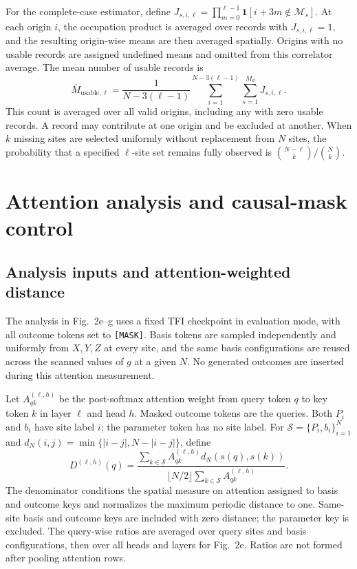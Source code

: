 \documentclass[11pt,a4paper]{article}
\newcommand{\TBD}[1]{\textcolor{red!70!black}{\textsf{[TBD: #1]}}}
\newcommand{\ind}{\mathbf{1}}
\newcommand{\sechead}[2]{\section{#2}}
\newcommand{\subhead}[1]{\subsection*{#1}}
\begin{document}
For the complete-case estimator, define
$J_{s,i,\ell}=\prod_{m=0}^{\ell-1}
\ind[i+3m\notin\mathcal{M}_s]$.
At each origin $i$, the occupation product is averaged over records
with $J_{s,i,\ell}=1$, and the resulting origin-wise means are then
averaged spatially. Origins with no usable records are assigned
undefined means and omitted from this correlator average. The mean
number of usable records is
\begin{equation}
\overline{M}_{\mathrm{usable},\ell}
=
\frac{1}{N-3(\ell-1)}
\sum_{i=1}^{N-3(\ell-1)}
\sum_{s=1}^{M_d}J_{s,i,\ell}.
\label{supp:eq:usable}
\end{equation}
This count is averaged over all valid origins, including any with
zero usable records. A record may contribute at one origin and be
excluded at another. When $k$ missing sites are selected uniformly
without replacement from $N$ sites, the probability that a specified
$\ell$-site set remains fully observed is
$\binom{N-\ell}{k}/\binom{N}{k}$.

\sechead{S5}{Attention analysis and causal-mask control}
\label{supp:attention}

\subhead{Analysis inputs and attention-weighted distance}
The analysis in Fig.~2e--g uses a fixed TFI checkpoint in evaluation mode,
with all outcome tokens set to \texttt{[MASK]}. Basis tokens are sampled
independently and uniformly from $X,Y,Z$ at every site, and the same
basis configurations are reused across the scanned values of $g$ at a
given $N$. No generated outcomes are inserted during this attention
measurement. 

Let $A^{(\ell,h)}_{qk}$ be the post-softmax attention weight from query
token $q$ to key token $k$ in layer $\ell$ and head $h$. Masked outcome
tokens are the queries. Both $P_i$ and $b_i$ have site label $i$;
the parameter token has no site label. For
$\mathcal{S}=\{P_i,b_i\}_{i=1}^{N}$ and
$d_N(i,j)=\min\{|i-j|,N-|i-j|\}$, define
\begin{equation}
D^{(\ell,h)}(q)=
\frac{\sum_{k\in\mathcal{S}}A^{(\ell,h)}_{qk}
d_N(s(q),s(k))}
{\lfloor N/2\rfloor\sum_{k\in\mathcal{S}}A^{(\ell,h)}_{qk}}.
\label{supp:eq:attention_distance}
\end{equation}
The denominator conditions the spatial measure on attention assigned to
basis and outcome keys and normalizes the maximum periodic distance to
one. Same-site basis and outcome keys are included with zero distance;
the parameter key is excluded. The query-wise ratios are averaged over
query sites and basis configurations, then over all heads and layers for
Fig.~2e. Ratios are not formed after pooling attention rows.
\end{document}
